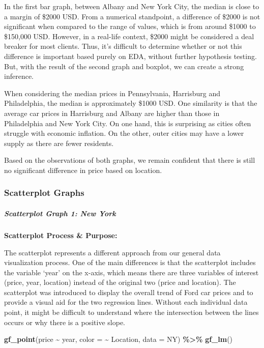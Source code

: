 \documentclass[
]{article}
\newenvironment{Shaded}{\begin{snugshade}}{\end{snugshade}}
\newcommand{\AttributeTok}[1]{\textcolor[rgb]{0.13,0.29,0.53}{#1}}
\newcommand{\FunctionTok}[1]{\textcolor[rgb]{0.13,0.29,0.53}{\textbf{#1}}}
\newcommand{\NormalTok}[1]{#1}
\newcommand{\SpecialCharTok}[1]{\textcolor[rgb]{0.81,0.36,0.00}{\textbf{#1}}}
\begin{document}
In the first bar graph, between Albany and New York City, the median is
close to a margin of \$2000 USD. From a numerical standpoint, a
difference of \$2000 is not significant when compared to the range of
values, which is from around \$1000 to \$150,000 USD. However, in a
real-life context, \$2000 might be considered a deal breaker for most
clients. Thus, it's difficult to determine whether or not this
difference is important based purely on EDA, without further hypothesis
testing. But, with the result of the second graph and boxplot, we can
create a strong inference.

When considering the median prices in Pennsylvania, Harrisburg and
Philadelphia, the median is approximately \$1000 USD. One similarity is
that the average car prices in Harrisburg and Albany are higher than
those in Philadelphia and New York City. On one hand, this is surprising
as cities often struggle with economic inflation. On the other, outer
cities may have a lower supply as there are fewer residents.

Based on the observations of both graphs, we remain confident that there
is still no significant difference in price based on location.

\hypertarget{scatterplot-graphs}{%
\subsubsection{\texorpdfstring{\textbf{Scatterplot
Graphs}}{Scatterplot Graphs}}\label{scatterplot-graphs}}

\hypertarget{scatterplot-graph-1-new-york}{%
\subparagraph{Scatterplot Graph 1: New
York}\label{scatterplot-graph-1-new-york}}

\textbf{Scatterplot Process \& Purpose:}

The scatterplot represents a different approach from our general data
visualization process. One of the main differences is that the
scatterplot includes the variable `year' on the x-axis, which means
there are three variables of interest (price, year, location) instead of
the original two (price and location). The scatterplot was introduced to
display the overall trend of Ford car prices and to provide a visual aid
for the two regression lines. Without each individual data point, it
might be difficult to understand where the intersection between the
lines occurs or why there is a positive slope.

\begin{Shaded}
\begin{Highlighting}[]
\FunctionTok{gf\_point}\NormalTok{(price }\SpecialCharTok{\textasciitilde{}}\NormalTok{ year, }\AttributeTok{color =} \SpecialCharTok{\textasciitilde{}}\NormalTok{ Location, }\AttributeTok{data =}\NormalTok{ NY) }\SpecialCharTok{\%\textgreater{}\%}
  \FunctionTok{gf\_lm}\NormalTok{()}
\end{Highlighting}
\end{Shaded}
\end{document}
